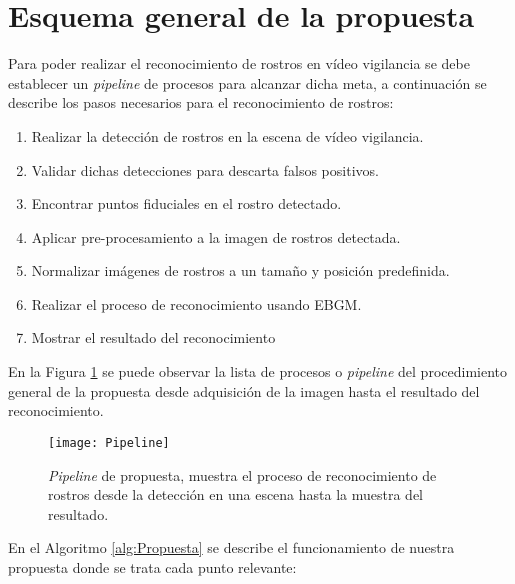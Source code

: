 \section{Esquema general de la propuesta}
Para poder realizar el reconocimiento de rostros en vídeo vigilancia se debe establecer un \textit{pipeline} de procesos para alcanzar dicha meta, a continuación se describe los pasos necesarios para el reconocimiento de rostros:
\begin{enumerate} [1.]
\item Realizar la detección de rostros en la escena de vídeo vigilancia.
\item Validar dichas detecciones para descarta falsos positivos.
\item Encontrar puntos fiduciales en el rostro detectado.
\item Aplicar pre-procesamiento a la imagen de rostros detectada.
\item Normalizar imágenes de rostros a un tamaño y posición predefinida.
\item Realizar el proceso de reconocimiento usando \ac{EBGM}.
\item Mostrar el resultado del reconocimiento
\end{enumerate}
En la Figura \ref{im:PropPipeline} se puede observar la lista de procesos o \textit{pipeline} del procedimiento general de la propuesta desde adquisición de la imagen hasta el resultado del reconocimiento.
\begin{figure}[h]
\center
\texttt{[image: Pipeline]}
\caption{\textit{Pipeline} de propuesta, muestra el proceso de reconocimiento de rostros desde la detección en una escena hasta la muestra del resultado.}
\label{im:PropPipeline}
\end{figure}

En el Algoritmo \ref{alg:Propuesta} se describe el funcionamiento de nuestra propuesta donde se trata cada punto relevante:

